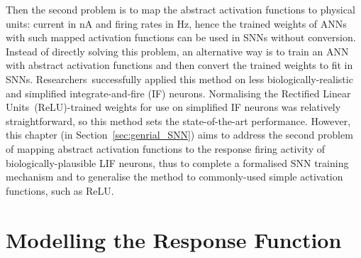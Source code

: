 	Then the second problem is to map the abstract activation functions to physical units: current in nA and firing rates in Hz, hence the trained weights of ANNs with such mapped activation functions can be used in SNNs without conversion.
	Instead of directly solving this problem, an alternative way is to train an ANN with abstract activation functions and then convert the trained weights to fit in SNNs.
	Researchers~\DIFdelbegin {}\DIFdelend \DIFaddbegin {}\DIFaddend successfully applied this method on less biologically-realistic and simplified integrate-and-fire (IF) neurons.
	Normalising the Rectified Linear Units~(ReLU)-trained weights for use on simplified IF neurons was relatively straightforward, so this method sets the state-of-the-art performance.
	However, this chapter (in Section~\ref{sec:genrial_SNN}) aims to address the second problem of mapping abstract activation functions to the response firing activity of biologically-plausible LIF neurons, thus to complete a formalised SNN training mechanism and to generalise the method to commonly-used simple activation functions, such as ReLU.
\section{Modelling the Response Function}
	\label{sec:response_func}
